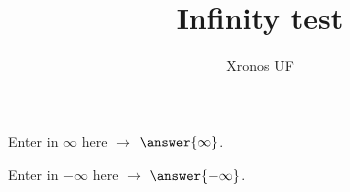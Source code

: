 \documentclass[•]{ximera}
\title{Infinity test}
\author{Xronos UF}
\begin{document}
\begin{problem}
Enter in $\infty$ here $\rightarrow$ \quad $\answer{\infty}$.
\end{problem}

\begin{problem}
Enter in $-\infty$ here $\rightarrow$ \quad $\answer{-\infty}$.
\end{problem}
\end{document}
